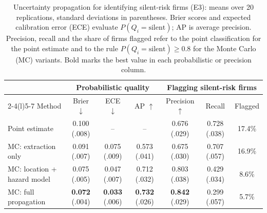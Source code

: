 \begin{table}[t]
\caption{Uncertainty propagation for identifying silent-risk firms (E3): means over 20 replications, standard deviations in parentheses. Brier scores and expected calibration error (ECE) evaluate $P(Q_i=\text{silent})$; AP is average precision. Precision, recall and the share of firms flagged refer to the point classification for the point estimate and to the rule $P(Q_i=\text{silent}) \geq 0.8$ for the Monte Carlo (MC) variants. Bold marks the best value in each probabilistic or precision column.}
\label{tab:e3}
\centering
\fontsize{8}{10}\selectfont
\setlength{\tabcolsep}{4.5pt}
\begin{tabular}{@{}lcccccc@{}}
\toprule
& \multicolumn{3}{c}{Probabilistic quality} & \multicolumn{3}{c}{Flagging silent-risk firms} \\
\cmidrule(lr){2-4}\cmidrule(l){5-7}
Method & Brier $\downarrow$ & ECE $\downarrow$ & AP $\uparrow$ & Precision $\uparrow$ & Recall & Flagged \\
\midrule
Point estimate & 0.100 (.008) & -- & -- & 0.676 (.029) & 0.728 (.038) & 17.4\% \\
MC: extraction only & 0.091 (.007) & 0.075 (.009) & 0.573 (.041) & 0.675 (.030) & 0.707 (.057) & 16.9\% \\
MC: location + hazard model & 0.075 (.005) & 0.047 (.007) & 0.712 (.032) & 0.803 (.038) & 0.429 (.034) & 8.6\% \\
MC: full propagation & \textbf{0.072} (.004) & \textbf{0.033} (.006) & \textbf{0.732} (.026) & \textbf{0.842} (.029) & 0.299 (.057) & 5.7\% \\
\bottomrule
\end{tabular}
\end{table}
